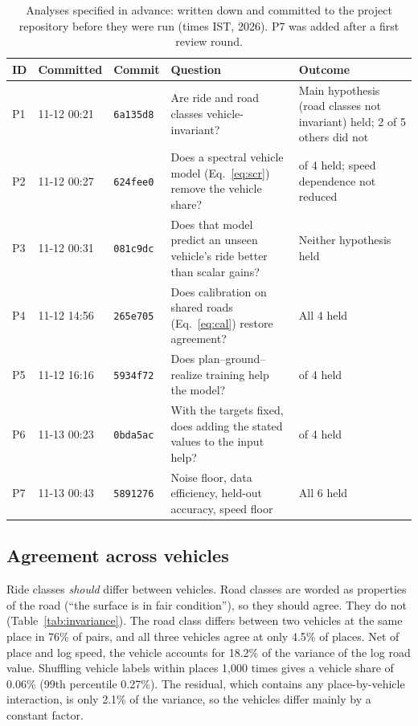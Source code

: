 \begin{table}[t]
\caption{Analyses specified in advance: written down and committed to the project repository before they were run (times IST, 2026). P7 was added after a first review round.}
\label{tab:prereg}
\centering
\footnotesize
\setlength{\tabcolsep}{4pt}
\begin{tabular}{@{}lll>{\raggedright\arraybackslash}p{6.8cm}>{\raggedright\arraybackslash}p{5.2cm}@{}}
\toprule
ID & Committed & Commit & Question & Outcome \\
\midrule
P1 & 11-12 00:21 & \texttt{6a135d8} & Are ride and road classes vehicle-invariant? & Main hypothesis (road classes not invariant) held; 2 of 5 others did not \\
P2 & 11-12 00:27 & \texttt{624fee0} & Does a spectral vehicle model (Eq.~\ref{eq:scr}) remove the vehicle share? & 3 of 4 held; speed dependence not reduced \\
P3 & 11-12 00:31 & \texttt{081c9dc} & Does that model predict an unseen vehicle's ride better than scalar gains? & Neither hypothesis held \\
P4 & 11-12 14:56 & \texttt{265e705} & Does calibration on shared roads (Eq.~\ref{eq:cal}) restore agreement? & All 4 held \\
P5 & 11-12 16:16 & \texttt{5934f72} & Does plan--ground--realize training help the model? & 2 of 4 held \\
P6 & 11-13 00:23 & \texttt{0bda5ac} & With the targets fixed, does adding the stated values to the input help? & 3 of 4 held \\
P7 & 11-13 00:43 & \texttt{5891276} & Noise floor, data efficiency, held-out accuracy, speed floor & All 6 held \\
\bottomrule
\end{tabular}
\end{table}

\subsection{Agreement across vehicles}
\label{sec:invariance}
Ride classes \emph{should} differ between vehicles. Road classes are worded as properties of the road (``the surface is in fair condition''), so they should agree.
They do not (Table~\ref{tab:invariance}).
The road class differs between two vehicles at the same place in 76\% of pairs, and all three vehicles agree at only 4.5\% of places.
Net of place and log speed, the vehicle accounts for 18.2\% of the variance of the log road value.
Shuffling vehicle labels within places 1{,}000 times gives a vehicle share of 0.06\% (99th percentile 0.27\%).
The residual, which contains any place-by-vehicle interaction, is only 2.1\% of the variance, so the vehicles differ mainly by a constant factor.


